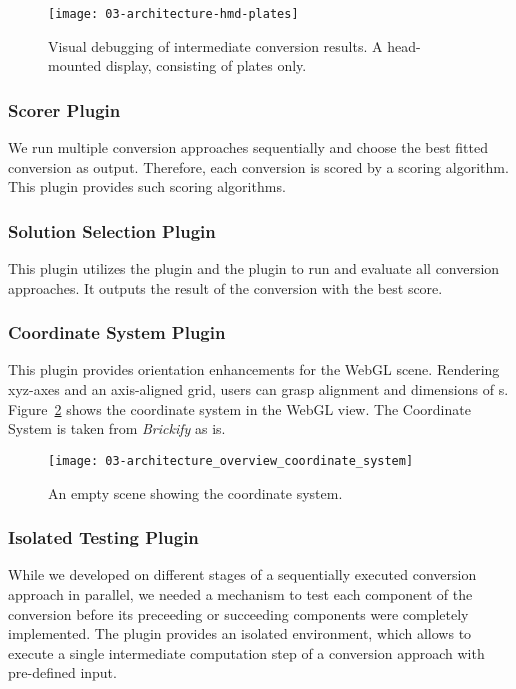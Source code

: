 \documentclass[../../ClassicThesis.tex]{subfiles}
\begin{document}
\begin{figure}[h]
  \centering
  \texttt{[image: 03-architecture-hmd-plates]}
  \caption{Visual debugging of intermediate conversion
    results. A head-mounted display, consisting of plates
    only.}
  \label{fig:steps-plate}
\end{figure}

\subsubsection{Scorer Plugin}

We run multiple conversion approaches sequentially and choose
the best fitted conversion as output. Therefore, each conversion
is scored by a scoring algorithm. This
plugin provides such scoring algorithms.

\subsubsection{Solution Selection Plugin}

This plugin utilizes the  plugin and
the  plugin to run and evaluate all conversion
approaches. It outputs the result of the conversion with the
best score.

\subsubsection{Coordinate System Plugin}

This plugin provides orientation enhancements for the WebGL
scene. Rendering xyz-axes and an axis-aligned grid, users
can grasp alignment and dimensions of {\threedmodel}s.
Figure~\ref{fig:architecture_overview_coordinate_system}
shows the coordinate system in the WebGL view. The
Coordinate System is taken from \emph{Brickify} as
is\cite[p.~92]{bachelor-thesis}.

\begin{figure}
  \texttt{[image: 03-architecture\_overview\_coordinate\_system]}
  \caption{An empty scene showing the coordinate system.}
  \label{fig:architecture_overview_coordinate_system}
\end{figure}

\subsubsection{Isolated Testing Plugin}

While we developed on different stages of a sequentially
executed conversion approach in parallel, we needed a
mechanism to test each component of the conversion before
its preceeding or succeeding components were completely
implemented. The  plugin provides an
isolated environment, which allows to execute a single
intermediate computation step of a conversion approach with
pre-defined input.
\end{document}
